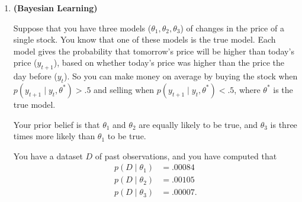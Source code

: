 \documentclass{article}
\newcounter{totalpoints}
\newcommand{\points}[1]{{\addtocounter{totalpoints}{#1}\textbf{[#1 points]}}}
\begin{document}
\begin{enumerate}
\begin{enumerate}
Submit all of your code for this question and question 1 (including provided boilerplate files) in a single zip file.

\item \points{2}
What was the accuracy of your trained 2-hidden-layer feedforward network on the two test sets?
\begin{answer}{2\baselineskip}
\end{answer}

\item \points{2}
What was the accuracy of your trained convolutional neural network on the two test sets?
\begin{answer}{2\baselineskip}
\end{answer}

\item \points{10}
Did one of your implementations perform substantially better on one of the test sets than the other implementation did?
If so, why?  If not, why not?
\begin{answer}{1.5in}
\end{answer}


\end{enumerate}

\clearpage
\item \textbf{(Bayesian Learning)}

Suppose that you have three models ($\theta_1,\theta_2,\theta_3$) of changes in the price of a single stock.
You know that one of these models is the true model.  Each model gives the probability that tomorrow's price will be higher than today's price ($y_{t+1}$), based on whether today's price was higher than the price the day before ($y_t$).  So you can make money on average by buying the stock when $p(y_{t+1} \mid y_t, \theta^*) > .5$ and selling when $p(y_{t+1} \mid y_t, \theta^*) < .5$, where $\theta^*$ is the true model.

Your prior belief is that $\theta_1$ and $\theta_2$ are equally likely to be true, and $\theta_3$ is three times more likely than $\theta_1$ to be true.

You have a dataset $D$ of past observations, and you have computed that
\begin{align*}
    p(D \mid \theta_1) &= .00084 \\
    p(D \mid \theta_2) &= .00105 \\
    p(D \mid \theta_3) &= .00007.
\end{align*}


\end{enumerate}
\end{document}
